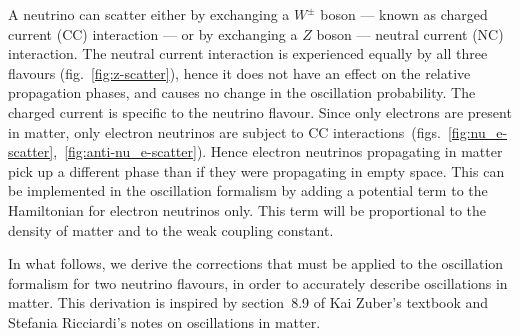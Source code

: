 A neutrino can scatter either by exchanging a $W^\pm$ boson --- known as
charged current (CC) interaction --- or by exchanging a $Z$ boson --- neutral
current (NC) interaction. The neutral current interaction is experienced
equally by all three flavours (fig.~\ref{fig:z-scatter}), hence it does not
have an effect on the relative
propagation phases, and causes no change in the oscillation probability. The
charged current is specific to the neutrino flavour. Since only
electrons are present in matter, only electron neutrinos are subject to CC
interactions~(figs.~\ref{fig:nu_e-scatter},~\ref{fig:anti-nu_e-scatter}). 
Hence electron neutrinos propagating in matter pick up a different phase than
if they were propagating in empty space. This can be implemented in the
oscillation formalism by adding a potential term to the Hamiltonian for
electron neutrinos only. This term will be proportional to the density of
matter and to the weak coupling constant\cite{zuber}.

In what follows, we derive the corrections that must be applied to the
oscillation formalism for two neutrino flavours, in order to accurately
describe oscillations in matter.
This derivation is inspired by section~8.9 of Kai Zuber's textbook\cite{zuber}
and Stefania Ricciardi's notes on oscillations in matter\cite{ricciardi}.

